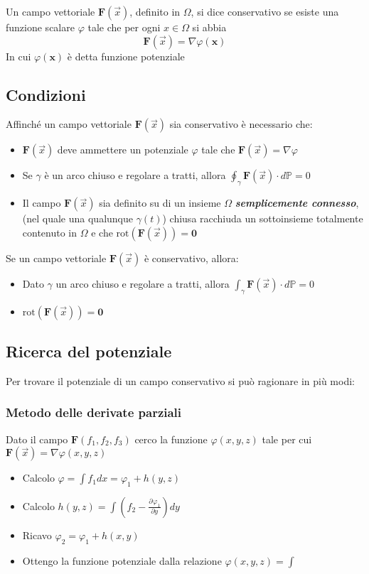 \documentclass[10pt,a4paper]{report}
\newcommand{\pdv}[3]{\frac{\partial^{#2} #1}{\partial #3^{#2}}}
\begin{document}
			Un campo vettoriale $ \mathbf{F}(\vec{x}) $, definito in $ \Omega $, si dice conservativo se 
			esiste una funzione scalare $ \varphi $ tale che per ogni $ x \in \Omega $ si abbia \[ \mathbf{F}(\vec{x}) = \nabla \varphi(\mathbf{x})\] In cui $ \varphi(\mathbf{x}) $ è detta funzione potenziale
			
			\subsection*{Condizioni}
			Affinché un campo vettoriale $ \mathbf{F}(\vec{x}) $ sia conservativo è necessario che:
			\begin{itemize}
                \item $ \mathbf{F}(\vec{x}) $ deve ammettere un potenziale $ \varphi $ tale che $ \mathbf{F}(\vec{x})= \nabla \varphi$
				\item Se $ \gamma $ è un arco chiuso e regolare a tratti, allora $ \oint_{\gamma } \mathbf{F}(\vec{x}) \cdot d\mathbb{P}  =  0$
				\item Il campo $ \mathbf{F}(\vec{x}) $ sia definito su di un insieme $ \Omega $ \textit{\textbf{semplicemente connesso}}, (nel quale una qualunque $ \gamma(t) $) chiusa racchiuda un sottoinsieme totalmente contenuto in $ \Omega $ e che $ \textrm{rot}(\mathbf{F}(\vec{x})) = \textbf{0} $ 
			\end{itemize}
			Se un campo vettoriale $ \mathbf{F}(\vec{x}) $ è conservativo, allora:
			\begin{itemize}
				\item Dato $ \gamma $ un arco chiuso e regolare a tratti, allora $ \int_{\gamma } \mathbf{F}(\vec{x}) \cdot d\mathbb{P}  =  0$
				\item $ \textrm{rot}(\mathbf{F}(\vec{x})) = \textbf{0} $
			\end{itemize}
		
			\subsection*{Ricerca del potenziale}
			Per trovare il potenziale di un campo conservativo si può ragionare in più modi:

                \subsubsection{Metodo delle derivate parziali}
                    Dato il campo $ \mathbf{F}(f_{1},f_{2},f_{3}) $ cerco la funzione $ \varphi(x,y,z) $ tale per cui $ \mathbf{F}(\vec{x}) = \nabla \varphi(x,y,z) $
                \begin{itemize}
                    \item Calcolo $ \varphi = \int f_{1} dx = \varphi_{1} + h(y,z)$
                    \item Calcolo $ h(y,z) = \int (f_{2} - \pdv{\varphi_{1}}{}{y})dy$
                    \item Ricavo $ \varphi_{2} = \varphi_{1} + h(x,y) $
                    \item Ottengo la funzione potenziale  dalla relazione $\varphi(x,y,z) = \int  $  
                \end{itemize} 
				
\end{document}
